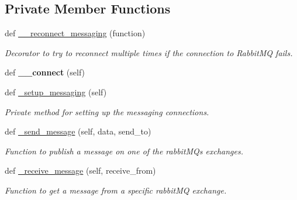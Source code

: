 \subsection*{Private Member Functions}
\begin{DoxyCompactItemize}
\item 
def \hyperlink{classtwitter_1_1bots_1_1rabbit__messaging_1_1RabbitMessaging_aa1f0c32cb8d52910117c7db2a070a708}{\+\_\+\+\_\+reconnect\+\_\+messaging} (function)
\begin{DoxyCompactList}\small\item\em Decorator to try to reconnect multiple times if the connection to Rabbit\+MQ fails. \end{DoxyCompactList}\item 
\mbox{\label{classtwitter_1_1bots_1_1rabbit__messaging_1_1RabbitMessaging_a3eb61ddf0a04971eb7ac7494bbc9012e}} 
def {\bfseries \+\_\+\+\_\+connect} (self)
\item 
\mbox{\label{classtwitter_1_1bots_1_1rabbit__messaging_1_1RabbitMessaging_a90cec3aa9d23d01e1bc04949226b2837}} 
def \hyperlink{classtwitter_1_1bots_1_1rabbit__messaging_1_1RabbitMessaging_a90cec3aa9d23d01e1bc04949226b2837}{\+\_\+setup\+\_\+messaging} (self)
\begin{DoxyCompactList}\small\item\em Private method for setting up the messaging connections. \end{DoxyCompactList}\item 
def \hyperlink{classtwitter_1_1bots_1_1rabbit__messaging_1_1RabbitMessaging_a82b3f62dcb3c12e53c03678128038832}{\+\_\+send\+\_\+message} (self, data, send\+\_\+to)
\begin{DoxyCompactList}\small\item\em Function to publish a message on one of the rabbit\+MQ\textquotesingle{}s exchanges. \end{DoxyCompactList}\item 
def \hyperlink{classtwitter_1_1bots_1_1rabbit__messaging_1_1RabbitMessaging_a9c1185869b76c0f456bda928697fec04}{\+\_\+receive\+\_\+message} (self, receive\+\_\+from)
\begin{DoxyCompactList}\small\item\em Function to get a message from a specific rabbit\+MQ exchange. \end{DoxyCompactList}\end{DoxyCompactItemize}
